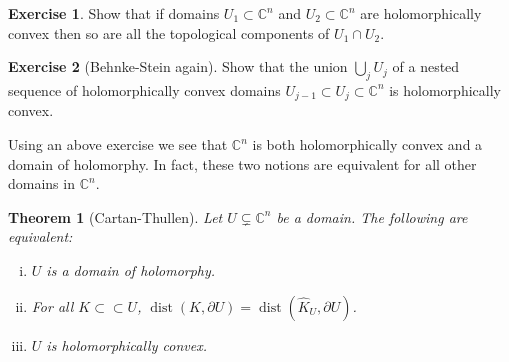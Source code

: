 \documentclass[12pt,openany]{book}
\newcommand{\C}{{\mathbb{C}}}
\theoremstyle{plain}
\newtheorem{thm}{Theorem}[section]
\theoremstyle{remark}
\theoremstyle{definition}
\newenvironment{exbox}{%
    \def\FrameCommand{\vrule width 1pt \relax\hspace {10pt}}%
    \MakeFramed {\advance \hsize -\width \FrameRestore }%
}{%
    \endMakeFramed
}
\theoremstyle{exercise}
\newtheorem{exercise}{Exercise}[section]
\theoremstyle{example}
\begin{document}
\begin{exbox}
\begin{exercise}
Show that if domains $U_1 \subset \C^n$ and $U_2 \subset \C^n$ are
holomorphically convex
then so are all the topological components of $U_1 \cap U_2$.
\end{exercise}

\begin{exercise}[Behnke-Stein again]
Show that the union $\bigcup_j U_j$ of a nested sequence of holomorphically
convex domains $U_{j-1} \subset U_j \subset \C^n$ is holomorphically convex.
\end{exercise}
\end{exbox}

Using an above exercise we see that $\C^n$ is both holomorphically convex and
a domain of holomorphy.  In fact, these two notions are equivalent for all
other domains in $\C^n$.

\begin{thm}[Cartan-Thullen]
\label{thm:cartthul}
Let $U \subsetneq \C^n$ be a domain.  The following are equivalent:
\begin{enumerate}[(i)]
\item \label{thm:cartthul:domhol}
$U$ is a domain of holomorphy.
\item \label{thm:cartthul:disthull}
For all $K \subset \subset U$,
$\operatorname{dist}(K,\partial U) = \operatorname{dist}(\widehat{K}_U,\partial U)$.
\item \label{thm:cartthul:holconv}
$U$ is holomorphically convex.
\end{enumerate}
\end{thm}
\end{document}
